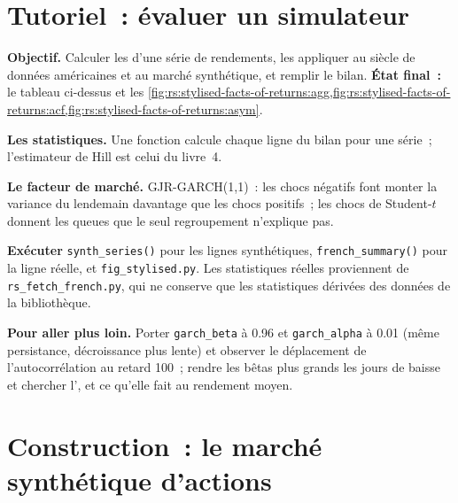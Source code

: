 \section{Tutoriel~: évaluer un simulateur}\label{tut:rs:stylised-facts-of-returns:scorecard}

\begin{tutorial}
\textbf{Objectif.} Calculer les  d'une série de rendements, les appliquer au siècle de données américaines et au marché synthétique,
et remplir le bilan. \textbf{État final~:} le tableau ci-dessus et les
\cref{fig:rs:stylised-facts-of-returns:agg,fig:rs:stylised-facts-of-returns:acf,fig:rs:stylised-facts-of-returns:asym}.
\begin{tutsteps}
\item \textbf{Les statistiques.} Une fonction calcule chaque ligne du bilan pour une série~; l'estimateur de Hill est celui du livre~4.
\label{lst:rs:stylised-facts-of-returns:facts}
\item \textbf{Le facteur de marché.} GJR-GARCH(1,1)~: les chocs négatifs font monter la variance du lendemain davantage que les chocs positifs~; les
chocs de Student-$t$ donnent les queues que le seul regroupement n'explique pas.
\label{lst:rs:stylised-facts-of-returns:garch}
\item \textbf{Exécuter} \texttt{synth\_series()} pour les lignes synthétiques, \texttt{french\_summary()} pour la ligne réelle, et
\texttt{fig\_stylised.py}. Les statistiques réelles proviennent de \texttt{rs\_fetch\_french.py}, qui ne conserve que les statistiques dérivées des
données de la bibliothèque.
\end{tutsteps}
\textbf{Pour aller plus loin.} Porter \texttt{garch\_beta} à 0.96 et \texttt{garch\_alpha} à 0.01 (même persistance, décroissance plus lente)
et observer le déplacement de l'autocorrélation au retard 100~; rendre les bêtas plus grands les jours de baisse et chercher l', et ce qu'elle fait
au rendement moyen.
\end{tutorial}

\section{Construction~: le marché synthétique d'actions}\label{bld:rs:stylised-facts-of-returns:synthmkt}

